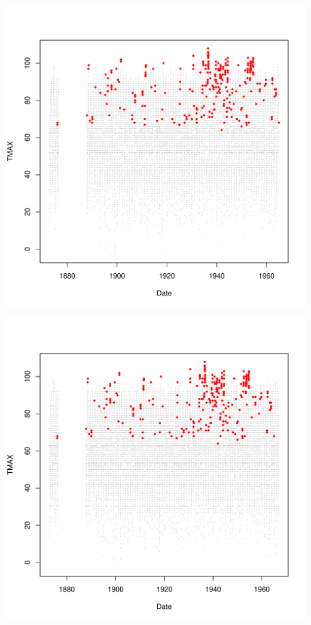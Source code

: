 \documentclass{article}\usepackage[]{graphicx}\usepackage[]{color}
\makeatletter
\def\maxwidth{ %
  \ifdim\Gin@nat@width>\linewidth
    \linewidth
  \else
    \Gin@nat@width
  \fi
}
\newenvironment{knitrout}{}{} %
\makeatother
\begin{document}
\begin{knitrout}
\includegraphics[width=\maxwidth]{figure/unnamed-chunk-4-42} 

\includegraphics[width=\maxwidth]{figure/unnamed-chunk-4-43} 


\end{knitrout}
\end{document}
